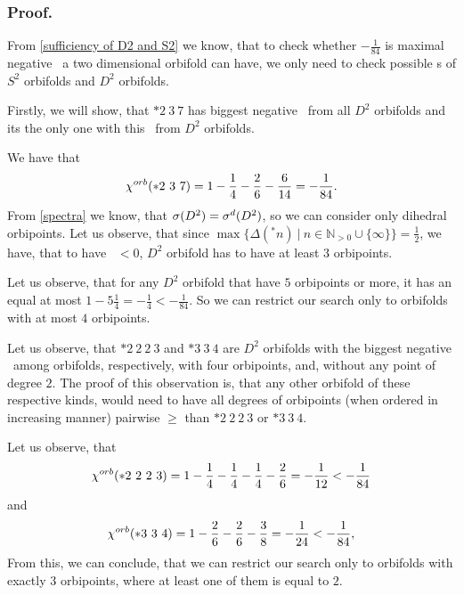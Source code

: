 \subsubsection{Proof.}
From \ref{sufficiency of D2 and S2} we know, that to check whether $-\frac{1}{84}$ is maximal 
negative \Eoc\ a two dimensional orbifold can have, we only need to check possible 
\Eoc s of $S^2$ orbifolds and $D^2$ orbifolds. 

Firstly, we will show, that $*2\ 3\ 7$ has biggest negative \Eoc\ from all $D^2$ orbifolds 
and its the only one with this \Eoc\ from $D^2$ orbifolds.

We have that 
\begin{equation}
{\chi^{orb}(*2\ 3\ 7)} = 1 - \frac{1}{4} - \frac{2}{6} - \frac{6}{14} = -\frac{1}{84}. 
\end{equation}
From \ref{spectra} we know, that ${{\sigma}(D^2)} = {\sigma}^d(D^2)$, so we can consider only dihedral 
orbipoints. 
Let us observe, that since 
$\max\{\Delta(^*n)\ |\ n \in \mathbb{N}_{>0} \cup \{\infty\}\} = \frac{1}{2}$, we have, that 
to have \Eoc\ $<0$, 
$D^2$ orbifold has to have at least $3$ orbipoints.
 
Let us observe, that for any $D^2$ orbifold that have $5$ orbipoints or more, it has an \Eoc 
equal at most $1 - 5\frac{1}{4} = -\frac{1}{4} < -\frac{1}{84}$. So we can restrict our search 
only to orbifolds with at most $4$ orbipoints. 

Let us observe, that $*2\ 2\ 2\ 3$ and $* 3\ 3\ 4$ are $D^2$ orbifolds with the biggest 
negative \Eoc\ among orbifolds, respectively, with four orbipoints, and, without any 
point of degree $2$. The proof of this observation is, that any other orbifold of these 
respective kinds, would need to have all degrees of orbipoints (when ordered in increasing manner) 
pairwise $\geq$ than $*2\ 2\ 2\ 3$ or $* 3\ 3\ 4$.

Let us observe, that 
\begin{equation}
{\chi^{orb}(*2\ 2\ 2\ 3)} = 1 - \frac{1}{4} - \frac{1}{4} - \frac{1}{4} - \frac{2}{6} = -\frac{1}{12} 
< -\frac{1}{84}
\end{equation}
and
\begin{equation}
\cho{*3\ 3\ 4} = 1 - \frac{2}{6} - \frac{2}{6} - \frac{3}{8} = -\frac{1}{24} < -\frac{1}{84},
\end{equation}
From this, we can conclude, that we can restrict our search only to orbifolds with 
exactly $3$ orbipoints, where at least one of them is equal to $2$. 

